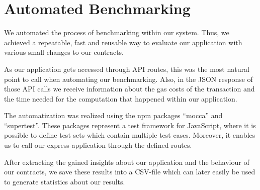 \section{Automated Benchmarking}

We automated the process of benchmarking within our system. 
Thus, we achieved a repeatable, fast and reusable way to evaluate our application with various small changes to our contracts.

As our application gets accessed through API routes, this was the most natural point to call when automating our benchmarking. 
Also, in the JSON response of those API calls we receive information about the gas costs of the transaction and the time needed for the computation that happened within our application.

The automatization was realized using the npm packages ``mocca'' and ``supertest''. 
These packages represent a test framework for JavaScript, where it is possible to define test sets which contain multiple test cases.
 Moreover, it enables us to call our express-application through the defined routes.

After extracting the gained insights about our application and the behaviour of our contracts, we save these results into a CSV-file which can later easily be used to generate statistics about our results.
